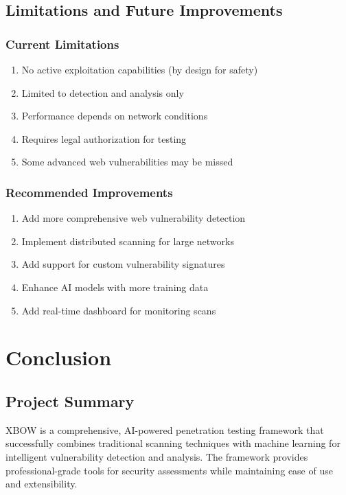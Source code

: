 \documentclass[12pt,a4paper]{report}
\begin{document}
\section{Limitations and Future Improvements}

\subsection{Current Limitations}

\begin{enumerate}
    \item No active exploitation capabilities (by design for safety)
    \item Limited to detection and analysis only
    \item Performance depends on network conditions
    \item Requires legal authorization for testing
    \item Some advanced web vulnerabilities may be missed
\end{enumerate}

\subsection{Recommended Improvements}

\begin{enumerate}
    \item Add more comprehensive web vulnerability detection
    \item Implement distributed scanning for large networks
    \item Add support for custom vulnerability signatures
    \item Enhance AI models with more training data
    \item Add real-time dashboard for monitoring scans
\end{enumerate}

\chapter{Conclusion}

\section{Project Summary}

XBOW is a comprehensive, AI-powered penetration testing framework that successfully combines traditional scanning techniques with machine learning for intelligent vulnerability detection and analysis. The framework provides professional-grade tools for security assessments while maintaining ease of use and extensibility.
\end{document}
